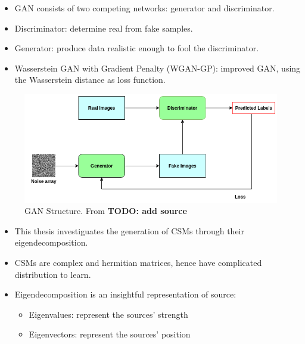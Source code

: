 \documentclass[12pt,pdftex,16x10]{elpres} %
\begin{document}
\begin{psli}
  \begin{itemize}
    \item GAN consists of two competing networks: generator and discriminator. 
    \item Discriminator: determine real from fake samples.
    \item Generator: produce data realistic enough to fool the discriminator.
    \item Wasserstein GAN with Gradient Penalty (WGAN-GP): improved GAN, using the  Wasserstein distance as loss function.
  \end{itemize}
  \begin{figure}[h]
    \centering
    \includegraphics[width=.3\textwidth]{figs/GAN_structure.png}
    \caption{GAN Structure. From \textbf{TODO: add source}}
  \end{figure}
\end{psli}



\begin{psli}
  \begin{itemize}
    \item This thesis investiguates the generation of CSMs through their eigendecomposition.
    \item CSMs are complex and hermitian matrices, hence have complicated distribution to learn.
    \item Eigendecomposition is an insightful representation of source:
    \begin{itemize}
      \item Eigenvalues: represent the sources' strength
      \item Eigenvectors: represent the sources' position
    \end{itemize}
  \end{itemize}
\end{psli}
\end{document}
